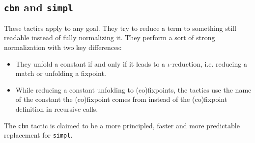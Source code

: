 \begin{coq_example*}
\subsection{\texorpdfstring{\texttt{cbn}}{cbn} and \texorpdfstring{\texttt{simpl}}{simpl}}
 

These tactics apply to any goal. They try to reduce a term to
something still readable instead of fully normalizing it. They perform
a sort of strong normalization with two key differences:
\begin{itemize}
\item They unfold a constant if and only if it leads to a
  $\iota$-reduction, i.e. reducing a match or unfolding a fixpoint.
\item While reducing a constant unfolding to (co)fixpoints, 
  the tactics use the name of the
  constant the (co)fixpoint comes from instead of the (co)fixpoint
  definition in recursive calls.
\end{itemize}

The \texttt{cbn} tactic is claimed to be a more principled, faster and more
predictable replacement for \texttt{simpl}.


\end{coq_example*}
